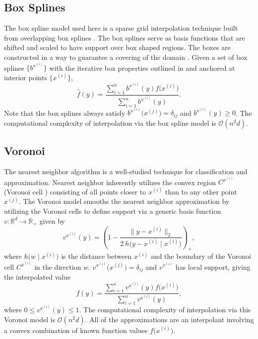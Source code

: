 \documentclass[smallextended,final]{svjour3}  %
\begin{document}
\subsection{Box Splines}
\label{sec:box-splines}

The box spline model used here is a sparse grid interpolation
technique built from overlapping box splines \cite{de2013box}. The box
splines serve as basis functions that are shifted and scaled to have
support over box shaped regions. The boxes are constructed in a way to
guarantee a covering of the domain \cite{lux2018novel}. Given a set of
box splines $\bigl\{b^{x^{(i)}}\bigr\}$ with the iterative box
properties outlined in \cite{lux2018novel} and anchored at interior
points $\bigl\{x^{(i)}\bigr\}$,
 $$ \hat f(y) = \frac{\sum\limits_{i=1}^n b^{x^{(i)}}(y) f\bigl(x^{(i)}\bigr)}{\sum\limits_{i=1}^n b^{x^{(i)}}(y)}. $$
Note that the box splines always satisfy
$b^{x^{(i)}}\bigl(x^{(j)}\bigr) = \delta_{ij}$ and $b^{x^{(i)}}(y)
\geq 0$. The computational complexity of interpolation via the box
spline model is $\mathcal{O}(n^2 d)$.

\subsection{Voronoi}
\label{sec:voronoi}

The nearest neighbor algorithm \cite{cover1967nearest} is a
well-studied technique for classification and approximation. Nearest
neighbor inherently utilizes the convex region $C^{x^{(i)}}$ (Voronoi
cell \cite{dirichlet1850reduction}) consisting of all points closer to
$x^{(i)}$ than to any other point $x^{(j)}$. The Voronoi model smooths
the nearest neighbor approximation by utilizing the Voronoi cells to
define support via a generic basis function $v: \mathbb{R}^d
\rightarrow \mathbb{R}_+$ given by
 $$ v^{x^{(i)}}(y) = \left(1 - \frac{\bigl\|y - x^{(i)}\bigr\|_2}
 {2 \ h \bigl(y - x^{(i)} \mid x^{(i)}\bigr)} \right)_+, $$
where $h\bigl(w \mid x^{(i)}\bigr)$ is the distance between $x^{(i)}$
and the boundary of the Voronoi cell $C^{x^{(i)}}$ in the direction
$w$. $v^{x^{(i)}}\bigl(x^{(j)}\bigr) = \delta_{ij}$ and $v^{x^{(i)}}$
has local support, giving the interpolated value
 $$ f(y) = \frac{\sum\limits_{i=1}^n v^{x^{(i)}}(y)
  f\bigl(x^{(i)}\bigr)}{\sum\limits_{i=1}^n v^{x^{(i)}}(y)}, $$
where $0 \leq v^{x^{(i)}}(y) \leq 1$. The computational complexity of
interpolation via this Voronoi model is $\mathcal{O}(n^2 d)$. All of
the approximations are an interpolant involving a convex combination
of known function values $f\bigl(x^{(i)}\bigr)$.
\end{document}
